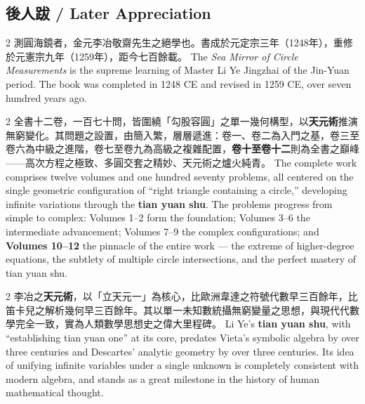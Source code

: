 \documentclass[11pt,a4paper]{article}
\begin{document}
\vspace{1cm}
\subsection*{後人跋 / Later Appreciation}

\begin{paracol}{2}
測圓海鏡者，金元李冶敬齋先生之絕學也。書成於元定宗三年（1248年），重修於元憲宗九年（1259年），距今七百餘載。
\switchcolumn
The \textit{Sea Mirror of Circle Measurements} is the supreme learning of Master Li Ye Jingzhai of the Jin-Yuan period. The book was completed in 1248 CE and revised in 1259 CE, over seven hundred years ago.
\end{paracol}

\vspace{0.2cm}

\begin{paracol}{2}
全書十二卷，一百七十問，皆圍繞「勾股容圓」之單一幾何構型，以\textbf{天元術}推演無窮變化。其問題之設置，由簡入繁，層層遞進：卷一、卷二為入門之基，卷三至卷六為中級之進階，卷七至卷九為高級之複雜配置，\textbf{卷十至卷十二}則為全書之巔峰——高次方程之極致、多圓交套之精妙、天元術之爐火純青。
\switchcolumn
The complete work comprises twelve volumes and one hundred seventy problems, all centered on the single geometric configuration of ``right triangle containing a circle,'' developing infinite variations through the \textbf{tian yuan shu}. The problems progress from simple to complex: Volumes 1--2 form the foundation; Volumes 3--6 the intermediate advancement; Volumes 7--9 the complex configurations; and \textbf{Volumes 10--12} the pinnacle of the entire work --- the extreme of higher-degree equations, the subtlety of multiple circle intersections, and the perfect mastery of tian yuan shu.
\end{paracol}

\vspace{0.2cm}

\begin{paracol}{2}
李冶之\textbf{天元術}，以「立天元一」為核心，比歐洲韋達之符號代數早三百餘年，比笛卡兒之解析幾何早三百餘年。其以單一未知數統攝無窮變量之思想，與現代代數學完全一致，實為人類數學思想史之偉大里程碑。
\switchcolumn
Li Ye's \textbf{tian yuan shu}, with ``establishing tian yuan one'' at its core, predates Vieta's symbolic algebra by over three centuries and Descartes' analytic geometry by over three centuries. Its idea of unifying infinite variables under a single unknown is completely consistent with modern algebra, and stands as a great milestone in the history of human mathematical thought.
\end{paracol}
\end{document}
